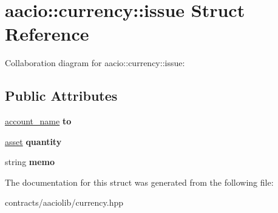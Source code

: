 \hypertarget{structaacio_1_1currency_1_1issue}{}\section{aacio\+:\+:currency\+:\+:issue Struct Reference}
\label{structaacio_1_1currency_1_1issue}


Collaboration diagram for aacio\+:\+:currency\+:\+:issue\+:
\subsection*{Public Attributes}
\begin{DoxyCompactItemize}
\item 
\mbox{\label{structaacio_1_1currency_1_1issue_a7c5ab4ee82cd6d719c5d4b1124514ea4}} 
\mbox{\hyperlink{structaacio_1_1chain_1_1name}{account\+\_\+name}} {\bfseries to}
\item 
\mbox{\label{structaacio_1_1currency_1_1issue_aba270390a2a2f7d6b77e26a4db5e1e1b}} 
\mbox{\hyperlink{structaacio_1_1asset}{asset}} {\bfseries quantity}
\item 
\mbox{\label{structaacio_1_1currency_1_1issue_a364c013723f978ae3c69ce77c62e94f6}} 
string {\bfseries memo}
\end{DoxyCompactItemize}


The documentation for this struct was generated from the following file\+:\begin{DoxyCompactItemize}
\item 
contracts/aaciolib/currency.\+hpp\end{DoxyCompactItemize}
